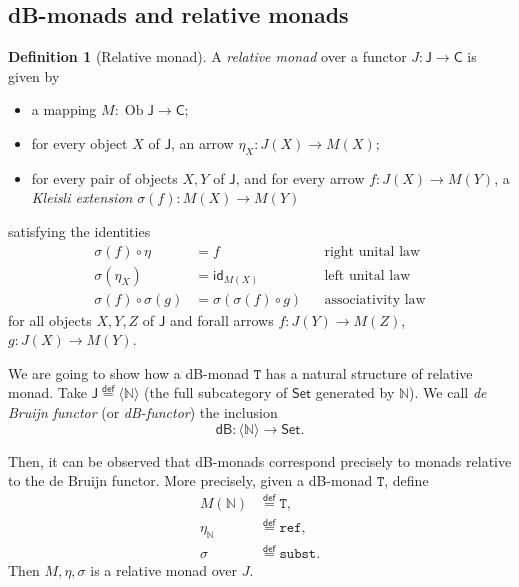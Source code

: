 \documentclass[a4paper,twoside,12pt]{article}
\theoremstyle{definition}
\newtheorem{definition}{Definition}
\theoremstyle{remark}
\theoremstyle{example}
\DeclareMathOperator{\Ob}{Ob}
\newcommand{\NN}{\mathbb{N}}
\newcommand{\TT}{\mathtt{T}}
\newcommand{\subst}{\mathtt{subst}}
\newcommand{\refe}{\mathtt{ref}}
\begin{document}
\subsection{dB-monads and relative monads}
\label{sec:subst-rel-monads}

\begin{definition}[Relative monad]
  A \emph{relative monad} over a functor
  $J\colon \mathsf{J}\to \mathsf{C}$ is given by
  \begin{itemize}
  \item a mapping $M:\Ob \mathsf{J} \to \mathsf{C}$;
  \item for every object $X$ of $\mathsf{J}$, an arrow $\eta_X\colon
    J(X) \to M(X)$;
  \item for every pair of objects $X,Y$ of $\mathsf{J}$, and for every
    arrow $f\colon J(X) \to M(Y)$, a \emph{Kleisli extension}
    $\sigma(f) \colon M(X) \to M(Y)$
  \end{itemize}
  satisfying the identities
  \begin{align*}
    \sigma(f) \circ \eta &= f &&\text{right unital law} \\
    \sigma(\eta_X) &= \mathsf{id}_{M(X)} &&\text{left unital law} \\
    \sigma(f) \circ \sigma(g) &= \sigma(\sigma(f) \circ g) &&\text{associativity law}
  \end{align*}
  for all objects $X,Y,Z$ of $\mathsf{J}$ and forall arrows
  $f\colon J(Y)\to M(Z)$, $g\colon J(X)\to M(Y)$.
\end{definition}

We are going to show how a dB-monad $\TT$ has a natural structure of
relative monad.  Take
$\mathsf{J} \stackrel{\mathsf{def}}{=}\langle \NN \rangle$ (the full
subcategory of $\mathsf{Set}$ generated by $\NN$).  We call \emph{de
  Bruijn functor} (or \emph{dB-functor}) the inclusion
\begin{equation}
  \label{eq:dB-functor}
  \mathsf{dB}\colon \langle \NN \rangle \to \mathsf{Set}.
\end{equation}

Then, it can be observed that dB-monads correspond precisely to monads
relative to the de Bruijn functor.  More precisely, given a dB-monad
$\TT$, define
\begin{align*}
  M(\NN) &\stackrel{\mathsf{def}}{=} \TT, \\
  \eta_\NN &\stackrel{\mathsf{def}}{=} \refe, \\
  \sigma &\stackrel{\mathsf{def}}{=} \subst.
\end{align*}
Then $M,\eta,\sigma$ is a relative monad over $J$.
\end{document}
